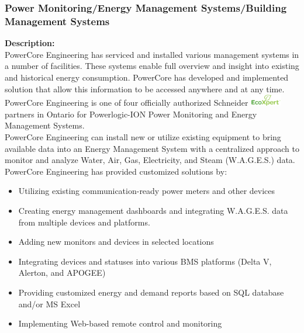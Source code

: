 \pagebreak

\subsubsection{Power Monitoring/Energy Management Systems/Building Management Systems}
\label{ETQ:PCEExp:PM}

\noindent \textbf{Description:}\\
	
PowerCore Engineering has serviced and installed various management systems in a number of facilities.  These systems enable full overview and insight into existing and historical energy consumption. PowerCore has developed and implemented solution that allow this information to be accessed anywhere and at any time.\\ 

PowerCore Engineering is one of four officially authorized Schneider \includegraphics[height=0.2in]{../Images/ecoxpert-logo.png} partners in Ontario for Powerlogic-ION Power Monitoring and Energy Management Systems.\\

PowerCore Engineering can install new or utilize existing equipment to bring available data into an Energy Management System with a centralized approach to monitor and analyze Water, Air, Gas, Electricity, and Steam (W.A.G.E.S.) data.\\

PowerCore Engineering has provided customized solutions by: 
\begin{itemize}
	\item Utilizing existing communication-ready power meters and other devices
	\item Creating energy management dashboards and integrating W.A.G.E.S. data from multiple devices and platforms.
	\item Adding new monitors and devices in selected locations
	\item Integrating devices and statuses into various BMS platforms (Delta V, Alerton, and APOGEE)
	\item Providing customized energy and demand reports based on SQL database and/or MS Excel
	\item Implementing Web-based remote control and monitoring

\end{itemize}


